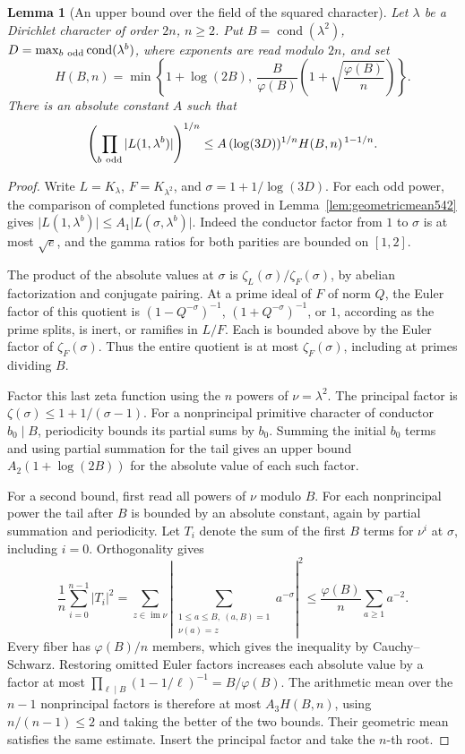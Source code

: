\documentclass[a4paper,11pt]{article}
\newtheorem{lemma}[proposition]{Lemma}
\theoremstyle{definition}
\theoremstyle{remark}
\numberwithin{equation}{section}
\begin{document}
\begin{lemma}[An upper bound over the field of the squared character]
\leavevmode\label{lem:squarefield633}
Let \(\lambda\) be a Dirichlet character of order \(2n\), \(n\ge2\).
Put \(B=\operatorname{cond}(\lambda^2)\),
\(D=\max_{b\ {\rm odd}}\operatorname{cond}(\lambda^b)\), where
exponents are read modulo \(2n\), and set
\[
 H(B,n)=\min\left\{1+\log(2B),\
        \frac{B}{\varphi(B)}\left(1+\sqrt{\frac{\varphi(B)}{n}}\right)
                  \right\}.
\]
There is an absolute constant \(A\) such that
\[
 \left(\prod_{b\ {\rm odd}} |L(1,\lambda^b)|\right)^{1/n}
 \le A\,(\log(3D))^{1/n} H(B,n)^{\,1-1/n}.
\]
\end{lemma}
\begin{proof}
Write \(L=K_\lambda\), \(F=K_{\lambda^2}\), and
\(\sigma=1+1/\log(3D)\). For each odd power, the comparison of
completed functions proved in Lemma~\ref{lem:geometricmean542} gives
\(\lvert L(1,\lambda^b)\rvert\le A_1\lvert L(\sigma,\lambda^b)\rvert\).
Indeed the conductor factor from \(1\) to \(\sigma\) is at most
\(\sqrt e\), and the gamma ratios for both parities are bounded on
\([1,2]\).

The product of the absolute values at \(\sigma\) is
\(\zeta_L(\sigma)/\zeta_F(\sigma)\), by abelian factorization and
conjugate pairing. At a prime ideal of \(F\) of norm \(Q\), the
Euler factor of this quotient is \((1-Q^{-\sigma})^{-1}\),
\((1+Q^{-\sigma})^{-1}\), or \(1\), according as the prime splits,
is inert, or ramifies in \(L/F\). Each is bounded above by the
Euler factor of \(\zeta_F(\sigma)\). Thus the entire quotient is
at most \(\zeta_F(\sigma)\), including at primes dividing \(B\).

Factor this last zeta function using the \(n\) powers of
\(\nu=\lambda^2\). The principal factor is
\(\zeta(\sigma)\le1+1/(\sigma-1)\). For a nonprincipal primitive
character of conductor \(b_0\mid B\), periodicity bounds its
partial sums by \(b_0\). Summing the initial \(b_0\) terms and using
partial summation for the tail gives an upper bound
\(A_2(1+\log(2B))\) for the absolute value of each such factor.

For a second bound, first read all powers of \(\nu\) modulo \(B\).
For each nonprincipal power the tail after \(B\) is bounded by an
absolute constant, again by partial summation and periodicity.
Let \(T_i\) denote the sum of the first \(B\) terms for \(\nu^i\)
at \(\sigma\), including \(i=0\). Orthogonality gives
\[
 \frac1n\sum_{i=0}^{n-1}|T_i|^2
 =\sum_{z\in\operatorname{im}\nu}
    \left|\sum_{\substack{1\le a\le B,\ (a,B)=1\\ \nu(a)=z}}
                      a^{-\sigma}\right|^2
 \le \frac{\varphi(B)}{n}\sum_{a\ge1} a^{-2}.
\]
Every fiber has \(\varphi(B)/n\) members, which gives the inequality
by Cauchy--Schwarz. Restoring omitted Euler factors increases each
absolute value by a factor at most
\(\prod_{\ell\mid B}(1-1/\ell)^{-1}=B/\varphi(B)\).
The arithmetic mean over the \(n-1\) nonprincipal factors is therefore
at most \(A_3H(B,n)\), using \(n/(n-1)\le2\) and taking the better
of the two bounds. Their geometric mean satisfies the same estimate.
Insert the principal factor and take the \(n\)-th root.
\end{proof}
\end{document}
